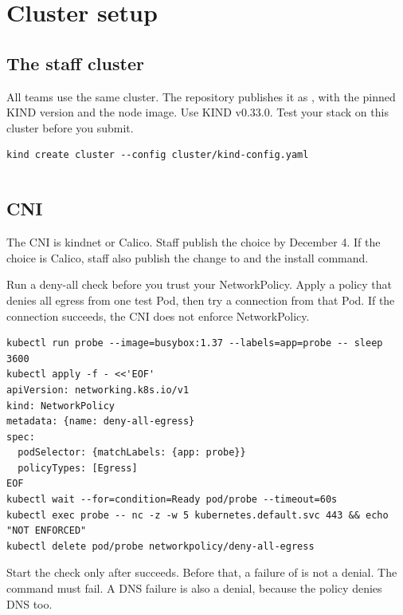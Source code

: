\documentclass[9pt,letterpaper]{article}
\newcommand\filelisting[4][]{%
  \par\smallskip\noindent\begin{minipage}{\linewidth}%
  \centerline{\small #2}\smallskip\inputminted[#1]{#3}{#4}\end{minipage}\par\smallskip}
\begin{document}
\section{Cluster setup}\label{sec:cluster}

\subsection{The staff cluster}\label{sec:kind}

All teams use the same cluster. The repository publishes it as
, with the pinned KIND version and the node
image. Use KIND v0.33.0. Test your stack on this cluster before you submit.

\begin{verbatim}
kind create cluster --config cluster/kind-config.yaml
\end{verbatim}

\filelisting{}{yaml}{../cluster/kind-config.yaml}

\subsection{CNI}\label{sec:cni}

The CNI is kindnet or Calico. Staff publish the choice by December 4. If the
choice is Calico, staff also publish the change to
 and the install command.

Run a deny-all check before you trust your NetworkPolicy. Apply a policy that
denies all egress from one test Pod, then try a connection from that Pod. If the
connection succeeds, the CNI does not enforce NetworkPolicy.

\begin{verbatim}
kubectl run probe --image=busybox:1.37 --labels=app=probe -- sleep 3600
kubectl apply -f - <<'EOF'
apiVersion: networking.k8s.io/v1
kind: NetworkPolicy
metadata: {name: deny-all-egress}
spec:
  podSelector: {matchLabels: {app: probe}}
  policyTypes: [Egress]
EOF
kubectl wait --for=condition=Ready pod/probe --timeout=60s
kubectl exec probe -- nc -z -w 5 kubernetes.default.svc 443 && echo "NOT ENFORCED"
kubectl delete pod/probe networkpolicy/deny-all-egress
\end{verbatim}

Start the check only after  succeeds. Before that, a
failure of  is not a denial. The  command must
fail. A DNS failure is also a denial, because the policy denies DNS too.
\end{document}
